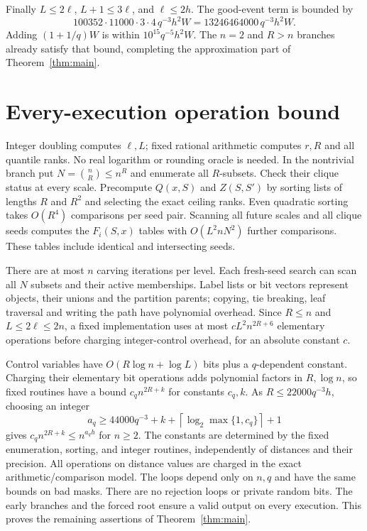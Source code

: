 \documentclass[acmsmall,11pt,nonacm]{acmart}
\theoremstyle{definition}
\newcommand{\ceil}[1]{\left\lceil #1\right\rceil}
\begin{document}
Finally $L\leq2\ell$, $L+1\leq3\ell$, and $\ell\leq2h$.
The good-event term is bounded by
\[
 100352\cdot11000\cdot3\cdot4\,q^{-3}h^2 W
   =13246464000\,q^{-3}h^2 W.
\]
Adding $(1+1/q)W$ is within $10^{15}q^{-5}h^2W$.
The $n=2$ and $R>n$ branches already satisfy that bound, completing
the approximation part of Theorem~\ref{thm:main}.

\section{Every-execution operation bound}\label{sec:runtime}

Integer doubling computes $\ell,L$; fixed rational arithmetic computes
$r,R$ and all quantile ranks. No real logarithm or rounding oracle is needed.
In the nontrivial branch put $N=\binom nR\leq n^R$ and enumerate all
$R$-subsets. Check their clique status at every scale. Precompute $Q(x,S)$
and $Z(S,S')$ by sorting lists of lengths $R$ and $R^2$ and selecting
the exact ceiling ranks. Even quadratic sorting takes $O(R^4)$ comparisons
per seed pair. Scanning all future scales and all clique seeds computes
the $F_i(S,x)$ tables with $O(L^2nN^2)$ further comparisons. These tables
include identical and intersecting seeds.

There are at most $n$ carving iterations per level. Each fresh-seed search
can scan all $N$ subsets and their active memberships. Label lists or bit
vectors represent objects, their unions and the partition parents; copying,
tie breaking, leaf traversal and writing the path have polynomial overhead.
Since $R\leq n$ and $L\leq2\ell\leq2n$, a fixed implementation uses at
most $cL^2n^{2R+6}$ elementary operations before charging integer-control
overhead, for an absolute constant $c$.

Control variables have $O(R\log n+\log L)$ bits plus a $q$-dependent
constant. Charging their elementary bit operations adds polynomial factors
in $R,\log n$, so fixed routines have a bound $c_q n^{2R+k}$ for constants
$c_q,k$. As $R\leq22000q^{-3}h$, choosing an integer
\[
 a_q\geq44000q^{-3}+k+\ceil{\log_2\max\{1,c_q\}}+1
\]
gives $c_qn^{2R+k}\leq n^{a_qh}$ for $n\geq2$.
The constants are determined by the fixed enumeration, sorting, and integer
routines, independently of distances and their precision. All operations
on distance values are charged in the exact arithmetic/comparison model.
The loops depend only on $n,q$ and have the same bounds on bad masks.
There are no rejection loops or private random bits. The early branches
and the forced root ensure a valid output on every execution. This proves
the remaining assertions of Theorem~\ref{thm:main}.
\end{document}
